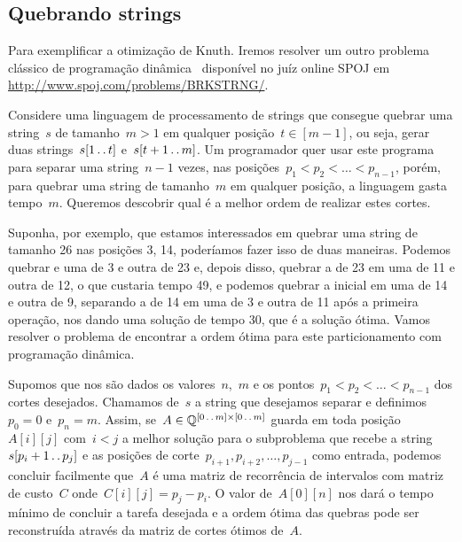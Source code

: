 
\subsection{Quebrando strings}

Para exemplificar a otimização de Knuth. Iremos resolver um outro problema clássico de programação dinâmica~\cite[Exercício~15-9]{CLRS} disponível no juíz online SPOJ em \url{http://www.spoj.com/problems/BRKSTRNG/}. 

Considere uma linguagem de processamento de strings que consegue quebrar uma string~$s$ de tamanho~$m > 1$ em qualquer posição~$t \in [m-1]$, ou seja, gerar duas strings~$s[1 \,.\,.\, t]$ e~$s[t+1 \,.\,.\, m]$. Um programador quer usar este programa para separar uma string~$n-1$ vezes, nas posições~$p_1 < p_2 < \dots < p_{n-1}$, porém, para quebrar uma string de tamanho~$m$ em qualquer posição, a linguagem gasta tempo~$m$. Queremos descobrir qual é a melhor ordem de realizar estes cortes. 

Suponha, por exemplo, que estamos interessados em quebrar uma string de tamanho 26 nas posições 3, 14, poderíamos fazer isso de duas maneiras. Podemos quebrar e uma de 3 e outra de 23 e, depois disso, quebrar a de 23 em uma de 11 e outra de 12, o que custaria tempo 49, e podemos quebrar a inicial em uma de 14 e outra de 9, separando a de 14 em uma de 3 e outra de 11 após a primeira operação, nos dando uma solução de tempo 30, que é a solução ótima. Vamos resolver o problema de encontrar a ordem ótima para este particionamento com programação dinâmica.

Supomos que nos são dados os valores~$n$,~$m$ e os pontos~$p_1 < p_2 < \dots < p_{n-1}$ dos cortes desejados. Chamamos de~$s$ a string que desejamos separar e definimos~$p_0 = 0$ e~$p_n = m$. Assim, se~$A \in \mathbb{Q}^{[0 \,.\,.\, m] \times [0 \,.\,.\, m]}$ guarda em toda posição~$A[i][j]$ com~$i < j$ a melhor solução para o subproblema que recebe a string~$s[p_i + 1 \,.\,.\, p_j]$ e as posições de corte~$p_{i+1},p_{i+2},\dots,p_{j-1}$ como entrada, podemos concluir facilmente que~$A$ é uma matriz de recorrência de intervalos com matriz de custo~$C$ onde~$C[i][j] = p_j - p_i$. O valor de~$A[0][n]$ nos dará o tempo mínimo de concluir a tarefa desejada e a ordem ótima das quebras pode ser reconstruída através da matriz de cortes ótimos de~$A$.



